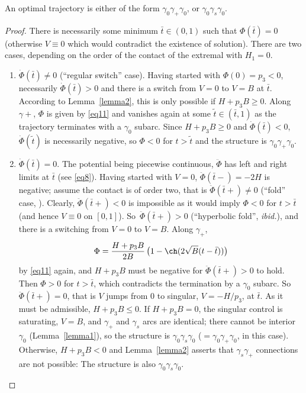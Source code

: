 \begin{cor} \label{cor1}
An optimal trajectory is either of the form $\gamma_0\gamma_+\gamma_0$,
or $\gamma_0\gamma_s\gamma_0$.
\end{cor}
\begin{proof} There is necessarily some minimum $\bar{t} \in (0,1)$ such that
$\Phi(\bar{t})=0$ (otherwise $V \equiv 0$ which would contradict the existence of
solution). There are two cases, depending on the order of the contact of the extremal
with $H_1=0$.

\begin{enumerate}
\item
$\dot{\Phi}(\bar{t}) \neq 0$ (``regular switch'' case). Having started with
$\Phi(0)=p_3<0$, necessarily $\dot{\Phi}(\bar{t})>0$ and there is a switch from $V=0$
to $V=B$ at $\bar{t}$. According to Lemma~\ref{lemma2}, this is only possible if
$H+p_3 B \geq 0$. Along $\gamma+$, $\Phi$ is given by \eqref{eq11} and vanishes again
at some $\tilde{t} \in (\bar{t},1)$ as the trajectory terminates with a $\gamma_0$
subarc. Since $H+p_3 B \geq 0$ and $\dot{\Phi}(\bar{t})<0$, $\dot{\Phi}(\tilde{t})$ is
necessarily negative, so $\Phi<0$ for $t > \tilde{t}$ and the structure is
$\gamma_0\gamma_+\gamma_0$.

\item
$\dot{\Phi}(\bar{t})=0$. The potential being piecewise continuous,
$\ddot{\Phi}$ has left and right limits at $\bar{t}$ (see \eqref{eq8}). Having started
with $V=0$, $\ddot{\Phi}(\bar{t}-)=-2H$ is negative; assume the contact is of order
two, that is $\ddot{\Phi}(\bar{t}+) \neq 0$ (``fold'' case, \cite{bonnard-2003a}).
Clearly, $\ddot{\Phi}(\bar{t}+)<0$ is impossible as it would imply $\Phi<0$ for $t >
\bar{t}$ (and hence $V \equiv 0$ on $[0,1]$). So~$\ddot{\Phi}(\bar{t}+)>0$
(``hyperbolic fold'', \textit{ibid.}), and there
is a switching from $V=0$ to $V=B$. Along $\gamma_+$,
\[
\Phi = \frac{H+p_3 B}{2B}\,\bigl(1-\ch(2\sqrt{B}(t-\bar{t}))\bigr)
\]
by \eqref{eq11} again, and $H+p_3 B$ must be negative for $\ddot{\Phi}(\bar{t}+)>0$ to
hold. Then $\Phi>0$ for $t > \bar{t}$, which contradicts the termination by a
$\gamma_0$ subarc. So $\ddot{\Phi}(\bar{t}+)=0$, that is $V$ jumps from $0$ to singular,
$V=-H/p_3$, at $\bar{t}$. As it
must be admissible, $H+p_3 B \leq 0$. If $H+p_3 B=0$, the singular control is
saturating, $V=B$, and $\gamma_+$ and $\gamma_s$ arcs are identical; there cannot be
interior $\gamma_0$ (Lemma~\ref{lemma1}), so the structure is
$\gamma_0\gamma_s\gamma_0$ ($=\gamma_0\gamma_+\gamma_0$, in this case).
Otherwise, $H+p_3 B<0$ and
Lemma~\ref{lemma2} asserts that $\gamma_s\gamma_+$ connections are not possible:
The structure is also $\gamma_0\gamma_s\gamma_0$.\qedhere
\end{enumerate}
\end{proof}

